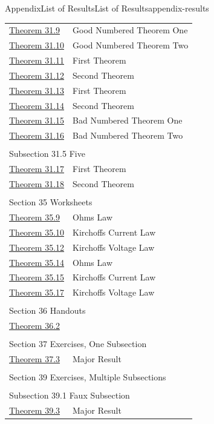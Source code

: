 \documentclass[twoside,10pt,]{article}
\numberwithin{equation}{section}
\begin{document}
\begin{appendixptx}{Appendix}{List of Results}{}{List of Results}{}{}{appendix-results}
\begin{longtable}[l]{ll}
\hyperref[theorem-good-one]{Theorem 31.9}& Good Numbered Theorem One\\
\hyperref[theorem-good-two]{Theorem 31.10}& Good Numbered Theorem Two\\
\hyperref[theorem-number-09]{Theorem 31.11}& First Theorem\\
\hyperref[theorem-number-10]{Theorem 31.12}& Second Theorem\\
\hyperref[theorem-number-11]{Theorem 31.13}& First Theorem\\
\hyperref[theorem-number-12]{Theorem 31.14}& Second Theorem\\
\hyperref[theorem-bad-one]{Theorem 31.15}& Bad Numbered Theorem One\\
\hyperref[theorem-bad-two]{Theorem 31.16}& Bad Numbered Theorem Two\\
\multicolumn{2}{l}{\null}\\[1.5ex] \multicolumn{2}{l}{\large Subsection 31.5 Five}\\[0.5ex]
\hyperref[theorem-number-13]{Theorem 31.17}& First Theorem\\
\hyperref[theorem-number-14]{Theorem 31.18}& Second Theorem\\
\multicolumn{2}{l}{\null}\\[1.5ex] \multicolumn{2}{l}{\large Section 35 Worksheets}\\[0.5ex]
\hyperref[worksheet-networks-2-3]{Theorem 35.9}& Ohms Law\\
\hyperref[worksheet-networks-2-4]{Theorem 35.10}& Kirchoffs Current Law\\
\hyperref[worksheet-networks-2-6]{Theorem 35.12}& Kirchoffs Voltage Law\\
\hyperref[worksheet-networks-pages-2-3]{Theorem 35.14}& Ohms Law\\
\hyperref[worksheet-networks-pages-2-4]{Theorem 35.15}& Kirchoffs Current Law\\
\hyperref[worksheet-networks-pages-2-6]{Theorem 35.17}& Kirchoffs Voltage Law\\
\multicolumn{2}{l}{\null}\\[1.5ex] \multicolumn{2}{l}{\large Section 36 Handouts}\\[0.5ex]
\hyperref[section-handouts-4-3-1]{Theorem 36.2}& \\
\multicolumn{2}{l}{\null}\\[1.5ex] \multicolumn{2}{l}{\large Section 37 Exercises, One Subsection}\\[0.5ex]
\hyperref[section-exercises-single-8]{Theorem 37.3}& Major Result\\
\multicolumn{2}{l}{\null}\\[1.5ex] \multicolumn{2}{l}{\large Section 39 Exercises, Multiple Subsections}\\[0.5ex]
\multicolumn{2}{l}{\null}\\[1.5ex] \multicolumn{2}{l}{\large Subsection 39.1 Faux Subsection}\\[0.5ex]
\hyperref[section-exercises-multiple-3-5]{Theorem 39.3}& Major Result\\
\end{longtable}
\end{appendixptx}
\end{document}
